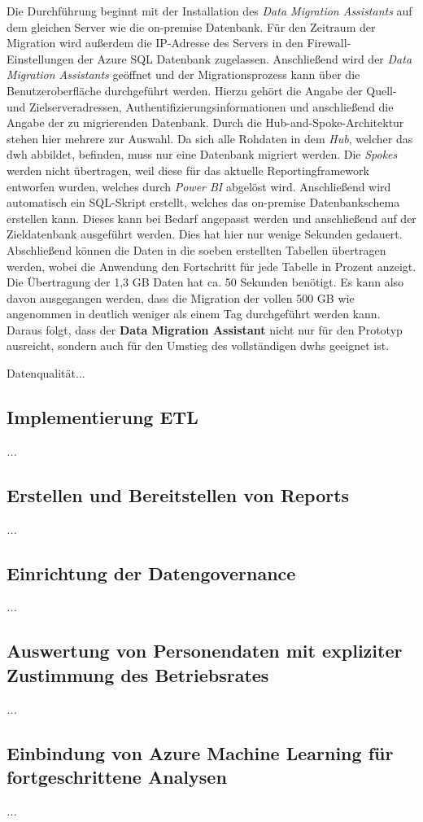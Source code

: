 Die Durchführung beginnt mit der Installation des \textit{Data Migration Assistants} auf dem gleichen Server wie die on-premise Datenbank. Für den Zeitraum der Migration wird außerdem die IP-Adresse des Servers in den Firewall-Einstellungen der Azure SQL Datenbank zugelassen. Anschließend wird der \textit{Data Migration Assistants} geöffnet und der Migrationsprozess kann über die Benutzeroberfläche durchgeführt werden. Hierzu gehört die Angabe der Quell- und Zielserveradressen, Authentifizierungsinformationen und anschließend die Angabe der zu migrierenden Datenbank. Durch die Hub-and-Spoke-Architektur stehen hier mehrere zur Auswahl. Da sich alle Rohdaten in dem \textit{Hub}, welcher das \ac{dwh} abbildet, befinden, muss nur eine Datenbank migriert werden. Die \textit{Spokes} werden nicht übertragen, weil diese für das aktuelle Reportingframework entworfen wurden, welches durch \textit{Power BI} abgelöst wird. Anschließend wird automatisch ein SQL-Skript erstellt, welches das on-premise Datenbankschema erstellen kann. Dieses kann bei Bedarf angepasst werden und anschließend auf der Zieldatenbank ausgeführt werden. Dies hat hier nur wenige Sekunden gedauert. Abschließend können die Daten in die soeben erstellten Tabellen übertragen werden, wobei die Anwendung den Fortschritt für jede Tabelle in Prozent anzeigt. Die Übertragung der 1,3 GB Daten hat ca. 50 Sekunden benötigt. Es kann also davon ausgegangen werden, dass die Migration der vollen 500 GB wie angenommen in deutlich weniger als einem Tag durchgeführt werden kann. Daraus folgt, dass der \textbf{Data Migration Assistant} nicht nur für den Prototyp ausreicht, sondern auch für den Umstieg des vollständigen \acp{dwh} geeignet ist.

Datenqualität...


\subsection{Implementierung ETL}
\textit{...}

\subsection{Erstellen und Bereitstellen von Reports}
\textit{...}

\subsection{Einrichtung der Datengovernance}
\textit{...}

\subsection{Auswertung von Personendaten mit expliziter Zustimmung des Betriebsrates}
\textit{...}

\subsection{Einbindung von Azure Machine Learning für fortgeschrittene Analysen}
\textit{...}